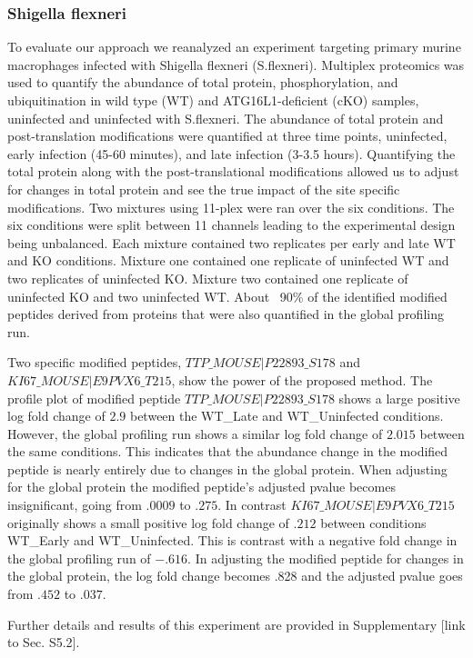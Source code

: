 \documentclass[mcp]{article}
\numberwithin{figure}{section} %
\numberwithin{table}{section}
\def\todo#1{{\color{red}[#1]}}
\begin{document}
\subsubsection*{Shigella flexneri}
To evaluate our approach we reanalyzed an experiment targeting primary murine macrophages infected with Shigella flexneri (S.flexneri). \cite{Maculins} Multiplex proteomics was used to quantify the abundance of total protein, phosphorylation, and ubiquitination in wild type (WT) and ATG16L1-deficient (cKO) samples, uninfected and uninfected with S.flexneri. The abundance of total protein and post-translation modifications were quantified at three time points, uninfected, early infection (45-60 minutes), and late infection (3-3.5 hours). Quantifying the total protein along with the post-translational modifications allowed us to adjust for changes in total protein and see the true impact of the site specific modifications. Two mixtures using 11-plex were ran over the six conditions. The six conditions were split between 11 channels leading to the experimental design being unbalanced. Each mixture contained two replicates per early and late WT and KO conditions. Mixture one contained one replicate of uninfected WT and two replicates of uninfected KO. Mixture two contained one replicate of uninfected KO and two uninfected WT. About ~90\% of the identified modified peptides derived from proteins that were also quantified in the global profiling run.

Two specific modified peptides, $TTP\_MOUSE|P22893\_S178$ and $KI67\_MOUSE|E9PVX6\_T215$, show the power of the proposed method.  The profile plot of modified peptide $TTP\_MOUSE|P22893\_S178$ shows a large positive log fold change of $2.9$ between the WT\_Late and WT\_Uninfected conditions. However, the global profiling run shows a similar log fold change of $2.015$ between  the same conditions. This indicates that the abundance change in the modified peptide is nearly entirely due to changes in the global protein. When adjusting for the global protein the modified peptide's adjusted pvalue becomes insignificant, going from $.0009$ to $.275$. In contrast $KI67\_MOUSE|E9PVX6\_T215$ originally shows a small positive log fold change of $.212$ between conditions WT\_Early and WT\_Uninfected. This is contrast with a negative fold change in the global profiling run of $-.616$. In adjusting the modified peptide for changes in the global protein, the log fold change becomes .828 and the adjusted pvalue goes from $.452$ to $.037$.

Further details and results of this experiment are provided in Supplementary \todo{link to Sec. S5.2}. 
\end{document}

